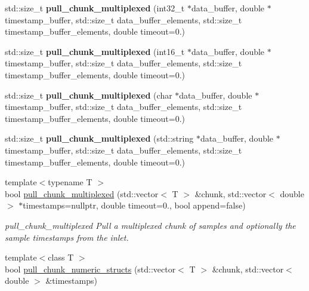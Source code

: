 \begin{DoxyCompactItemize}
\item 
\mbox{\label{classlsl_1_1stream__inlet_a3b93d803b348905bc34747c5820d6364}} 
std\+::size\+\_\+t {\bfseries pull\+\_\+chunk\+\_\+multiplexed} (int32\+\_\+t $\ast$data\+\_\+buffer, double $\ast$timestamp\+\_\+buffer, std\+::size\+\_\+t data\+\_\+buffer\+\_\+elements, std\+::size\+\_\+t timestamp\+\_\+buffer\+\_\+elements, double timeout=0.)
\item 
\mbox{\label{classlsl_1_1stream__inlet_a40e9727b155e274df482e4579e60f3b3}} 
std\+::size\+\_\+t {\bfseries pull\+\_\+chunk\+\_\+multiplexed} (int16\+\_\+t $\ast$data\+\_\+buffer, double $\ast$timestamp\+\_\+buffer, std\+::size\+\_\+t data\+\_\+buffer\+\_\+elements, std\+::size\+\_\+t timestamp\+\_\+buffer\+\_\+elements, double timeout=0.)
\item 
\mbox{\label{classlsl_1_1stream__inlet_a85ee4c75121e8ee54de22f228a3abae5}} 
std\+::size\+\_\+t {\bfseries pull\+\_\+chunk\+\_\+multiplexed} (char $\ast$data\+\_\+buffer, double $\ast$timestamp\+\_\+buffer, std\+::size\+\_\+t data\+\_\+buffer\+\_\+elements, std\+::size\+\_\+t timestamp\+\_\+buffer\+\_\+elements, double timeout=0.)
\item 
\mbox{\label{classlsl_1_1stream__inlet_a6a0f2f39152a2975571d5073d9967646}} 
std\+::size\+\_\+t {\bfseries pull\+\_\+chunk\+\_\+multiplexed} (std\+::string $\ast$data\+\_\+buffer, double $\ast$timestamp\+\_\+buffer, std\+::size\+\_\+t data\+\_\+buffer\+\_\+elements, std\+::size\+\_\+t timestamp\+\_\+buffer\+\_\+elements, double timeout=0.)
\item 
{\footnotesize template$<$typename T $>$ }\\bool \hyperlink{classlsl_1_1stream__inlet_a9ac87825319b345987fdd54e606fd56f}{pull\+\_\+chunk\+\_\+multiplexed} (std\+::vector$<$ T $>$ \&chunk, std\+::vector$<$ double $>$ $\ast$timestamps=nullptr, double timeout=0., bool append=false)
\begin{DoxyCompactList}\small\item\em pull\+\_\+chunk\+\_\+multiplexed Pull a multiplexed chunk of samples and optionally the sample timestamps from the inlet. \end{DoxyCompactList}\item 
{\footnotesize template$<$class T $>$ }\\bool \hyperlink{classlsl_1_1stream__inlet_a018caadb9a2c61f0c1c6388f7b617008}{pull\+\_\+chunk\+\_\+numeric\+\_\+structs} (std\+::vector$<$ T $>$ \&chunk, std\+::vector$<$ double $>$ \&timestamps)

\end{DoxyCompactItemize}
